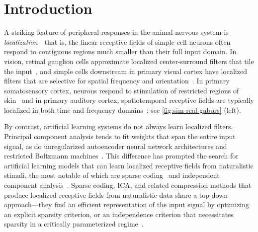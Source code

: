\section{Introduction}
\label{sec:introduction}

A striking feature of peripheral responses in the animal nervous system is \emph{localization}---that is,
the linear receptive fields of simple-cell neurons often respond to contiguous regions much smaller than their full input domain. 
In vision, retinal ganglion cells approximate localized center-surround filters that tile the input~\parencite{dacey2000center,doi2012efficient,knudsen1978space},
and simple cells downstream in primary visual cortex have localized filters that are selective for spatial frequency and orientation~\parencite{hubel1959receptive,hubel1968receptive,rolls1995sparseness,niell2008highly,willmore2011sparse,ringach2002orientation,ringach2002spatial}.
In primary somatosensory cortex, neurons respond to stimulation of restricted regions of skin~\parencite{crochet2011synaptic} and
in primary auditory cortex, spatiotemporal receptive fields are typically localized in both time and frequency domains~\parencite{deweese2003binary,hromadka2008sparse};
see \cref{fig:sim-real-gabors} (left).

By contrast, artificial learning systems do not always learn localized filters. 
Principal component analysis tends to fit weights that span the entire input signal, as do unregularized autoencoder neural network architectures and restricted Boltzmann machines~\parencite{saxe2011unsupervised}.
This difference has prompted the search for artificial learning models that can learn 
localized receptive fields from naturalistic stimuli,
the most notable of which are sparse coding~\parencite{olshausen1996emergence,olshausen1997sparse}
and independent component analysis~\parencite[ICA;~][]{bell1997independent,vanhateren1998independent}.
Sparse coding, ICA, and related compression methods that produce localized receptive fields from naturalistic data share a top-down approach---they find an efficient representation of the input signal by optimizing an explicit sparsity criterion, or an independence criterion that necessitates sparsity in a critically parameterized regime~\cite{field1999wavelets,saxe2011unsupervised}.

